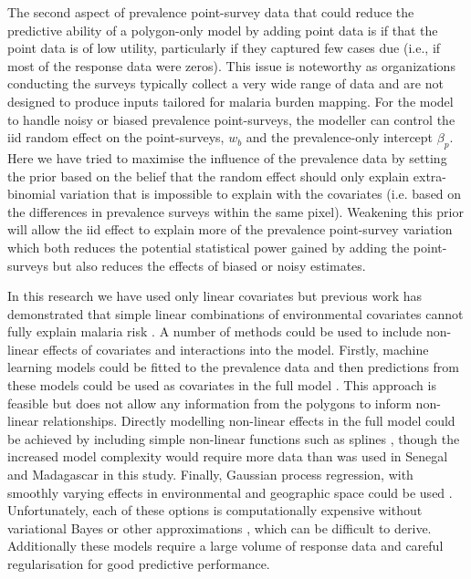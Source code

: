 \documentclass{statsoc}
\begin{document}
The second aspect of prevalence point-survey data that could reduce the predictive ability of a polygon-only model by adding point data is if that the point data is of low utility, particularly if they captured few cases due (i.e., if most of the response data were zeros). 
This issue is noteworthy as organizations conducting the surveys typically collect a very wide range of data and are not designed to produce inputs tailored for malaria burden mapping. 
For the model to handle noisy or biased prevalence point-surveys, the modeller can control the iid random effect on the point-surveys, $w_b$ and the prevalence-only intercept $\beta_p$. 
Here we have tried to maximise the influence of the prevalence data by setting the prior based on the belief that the random effect should only explain extra-binomial variation that is impossible to explain with the covariates (i.e. based on the differences in prevalence surveys within the same pixel).
Weakening this prior will allow the iid effect to explain more of the prevalence point-survey variation which both reduces the potential statistical power gained by adding the point-surveys but also reduces the effects of biased or noisy estimates.


In this research we have used only linear covariates but previous work has demonstrated that simple linear combinations of environmental covariates cannot fully explain malaria risk \citep{bhatt2017improved}.
A number of methods could be used to include non-linear effects of covariates and interactions into the model.
Firstly, machine learning models could be fitted to the prevalence data and then predictions from these models could be used as covariates in the full model \citep{bhatt2017improved}.
This approach is feasible but does not allow any information from the polygons to inform non-linear relationships.
Directly modelling non-linear effects in the full model could be achieved by including simple non-linear functions such as splines \citep{sissoko2017temporal, sewe2017using, hundessa2018projecting}, though the increased model complexity would require more data than was used in Senegal and Madagascar in this study.
Finally, Gaussian process regression, with smoothly varying effects in environmental and geographic space could be used \citep{law2018variational}.
Unfortunately, each of these options is computationally expensive without variational Bayes or other approximations \citep{law2018variational, ton2018spatial}, which can be difficult to derive.
Additionally these models require a large volume of response data and careful regularisation for good predictive performance.
\end{document}
